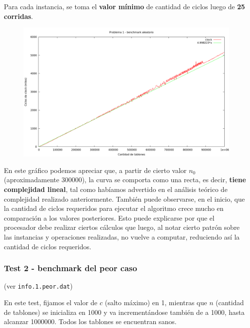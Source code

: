 Para cada instancia, se toma el \textbf{valor mínimo} de cantidad de ciclos luego de \textbf{25 corridas}.

\vspace*{0.5cm}

\begin{figure}[h]
  \begin{center}
    \includegraphics[scale=0.35]{imagenes/grafico-1.png}
  \end{center}
\end{figure}

\vspace*{0.5cm}

En este gráfico podemos apreciar que, a partir de cierto valor $n_0$ (aproximadamente 300000), la
curva se comporta como una recta, es decir, \textbf{tiene complejidad lineal}, tal como habíamos
advertido en el análisis teórico de complejidad realizado anteriormente. También puede observarse, en
el inicio, que la cantidad de ciclos requeridos para ejecutar el algoritmo crece mucho en comparación
a los valores posteriores. Esto puede explicarse por que el procesador debe realizar ciertos cálculos que
luego, al notar cierto patrón sobre las instancias y operaciones realizadas, no vuelve a computar,
reduciendo así la cantidad de ciclos requeridos.


\newpage


\subsubsection{Test 2 - benchmark del peor caso}

(ver \verb|info.1.peor.dat|) \medskip

En este test, fijamos el valor de $c$ (salto máximo) en 1, mientras que $n$ (cantidad de tablones)
se inicializa en 1000 y va incrementándose también de a 1000, hasta alcanzar 1000000. Todos los
tablones se encuentran sanos.

